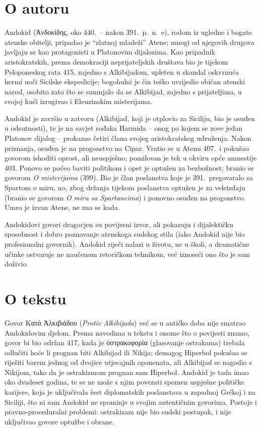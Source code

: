 \section*{O autoru}

Andokid \textgreek[variant=ancient]{(Ἀνδοκίδης,} oko 440.\ – nakon 391.\ p.~n.~e), rodom iz ugledne i bogate atenske obitelji, pripadao je ``zlatnoj mladeži'' Atene; mnogi od njegovih drugova javljaju se kao protagonisti u Platonovim dijalozima. Kao pripadnik aristokratskih, prema demokraciji neprijateljskih društava bio je tijekom Peloponeskog rata 415, zajedno s Alkibijadom, upleten u skandal oskvrnuća hermi uoči Sicilske ekspedicije; bogohulni je čin teško uvrijedio običan atenski narod, osobito zato što se sumnjalo da se Alkibijad, zajedno s prijateljima, u svojoj kući izrugivao i Eleuzinskim misterijama.

Andokid je završio u zatvoru (Alkibijad, koji je otplovio za Siciliju, bio je osuđen u odsutnosti), te je na savjet rođaka Harmida – onog po kojem se zove jedan Platonov dijalog – prokazao četiri člana svojeg aristokratskog udruženja. Nakon priznanja, osuđen je na progonstvo na Cipar. Vratio se u Atenu 407.\ i pokušao govorom ishoditi oprost, ali neuspješno; pomilovan je tek u okviru opće amnestije 403. Ponovo se počeo baviti politikom i opet je optužen za bezbožnost; branio se govorom \textit{O misterijama} (399). Bio je član poslanstva koje je 391.\ pregovaralo sa Spartom o miru, no, zbog držanja tijekom poslanstva optužen je za veleizdaju (branio se govorom \textit{O miru sa Spartancima}) i ponovno osuđen na progonstvo. Umro je izvan Atene, ne zna se kada.

Andokidovi govori dragocjen su povijesni izvor, ali pokazuju i dijalektičku sposobnost i dobro poznavanje atenskoga sudskog stila (iako Andokid nije bio profesionalni govornik). Andokid riječi nalazi u životu, ne u školi, a dramatične učinke ostvaruje ne naučenom retoričkom tehnikom, već iznoseći ono što je sam doživio.

\section*{O tekstu}

Govor \textgreek[variant=ancient]{Κατὰ Ἀλκιβιάδου} (\textit{Protiv Alkibijada}) već se u antičko doba nije smatrao Andokidovim djelom. Prema navodima u tekstu i onome što o povijesti znamo, govor bi bio održan 417, kada je \textgreek[variant=ancient]{ὀστρακοφορία} (glasovanje ostrakama) trebala odlučiti hoće li prognan biti Alkibijad ili Nikija; demagog Hiperbol pokušao se riješiti barem jednog od dvojice utjecajnih oponenata, ali Alkibijad se nagodio s Nikijom, tako da je ostrakizmom prognan sam Hiperbol. Andokid je tada imao oko dvadeset godina, te se ne može s njim povezati spomen uspješne političke karijere, koja je uključivala šest diplomatskih poslanstava u zapadnoj Grčkoj i na Siciliji, što ni sam Andokid ne spominje u svojim autentičnim govorima. Postoje i pravno-proceduralni problemi: ostrakizam nije bio sudski postupak, i nije uključivao govore optužbe i obrane.


